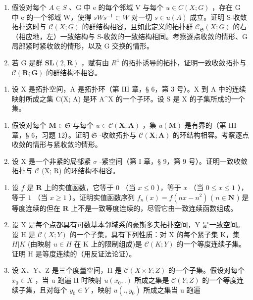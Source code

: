 \begin{enumerate}
\def\labelenumi{\alph{enumi})}
\item
  假设对每个 \(A \in S\) 、G 中 e 的每个邻域 V 与每个 \(u \in C(X; G)\) ，存在 G 中 e 的一个邻域 W，使得 \(sWs^{-1} \subset W\) 对一切 \(s \in u(A)\) 成立。证明 S-收敛拓扑这时与 \(\mathcal{C}(X; G)\) 的群结构相容，且如此定义的拓扑群 \(\mathcal{C}_{\mathfrak{S}}(X; G)\) 的右（相应地，左）一致结构与 S-收敛的一致结构相同。考察逐点收敛的情形、G 局部紧时紧收敛的情形，以及 G 交换的情形。
\item
  若 G 是群 \(\mathbf{SL}(2, \mathbf{R})\) ，赋有由 \(R^{4}\) 的拓扑诱导的拓扑，证明一致收敛拓扑与 \(\mathcal{C}(\mathbf{R}; \mathbf{G})\) 的群结构不相容。
\end{enumerate}

\begin{enumerate}
\def\labelenumi{\arabic{enumi})}
\setcounter{enumi}{11}
\tightlist
\item
  设 X 是拓扑空间，A 是拓扑环（第 III 章，§ 6，第 3 号）。X 到 A 中的连续映射所成之集 C(X; A) 是环 A\^{}X 的一个子环。设 S 是 X 的子集所成的一个集。
\end{enumerate}

\begin{enumerate}
\def\labelenumi{\alph{enumi})}
\item
  假设对每个 \(\mathbf{M} \in \mathfrak{S}\) 与每个 \(u \in \mathcal{C}(\mathbf{X}; \mathbf{A})\) ，集 \(u(\mathbf{M})\) 是有界的（第 III 章，§ 6，习题 12）。证明 \(\mathfrak{S}\) -收敛拓扑与 \(\mathcal{C}(\mathbf{X}; \mathbf{A})\) 的环结构相容。考察逐点收敛的情形与紧收敛的情形。
\item
  设 X 是一个非紧的局部紧 \(\sigma\) -紧空间（第 I 章，§ 9，第 9 号）。证明一致收敛拓扑与 \(\mathcal{C}\) (X; R) 的环结构不相容。
\end{enumerate}

\ExerciseSection

\begin{enumerate}
\def\labelenumi{\arabic{enumi})}
\item
  设 \(f\) 是 \(\mathbf{R}\) 上的实值函数，它等于 \(0\) （当 \(x \leqslant 0\) ），等于 \(x\) （当 \(0 \leqslant x \leqslant 1\) ），等于 \(1\) （当 \(x \geqslant 1\) ）。证明实值函数序列 \(f_n(x) = f(nx - n^2)\) ( \(n \in \mathbf{N}\) ) 是等度连续的但在 \(\mathbf{R}\) 上不是一致等度连续的，尽管它由一致连续函数组成。
\item
  设 X 是每个点都具有可数基本邻域系的豪斯多夫拓扑空间，Y 是一致空间。设 H 是 \(\mathcal{C}(X;Y)\) 的一个子集，具有下列性质：对 X 的每个紧子集 K，集 \(H|K\) (由映射 \(u\in H\) 在 K 上的限制组成)是 \(\mathcal{C}(K;Y)\) 的一个等度连续子集。证明 H 是等度连续的（用反证法论证）。
\item
  设 X、Y、Z 是三个度量空间，H 是 \(\mathcal{C}(X \times Y; Z)\) 的一个子集。假设对每个 \(x_{0} \in X\) ，当 u 跑遍 H 时映射 \(u(x_{0}, .)\) 所成之集是 \(\mathcal{C}(Y; Z)\) 的一个等度连续子集，且对每个 \(y_{0} \in Y\) ，映射 \(u(., y_{0})\) 所成之集当 u 跑遍
\end{enumerate}

